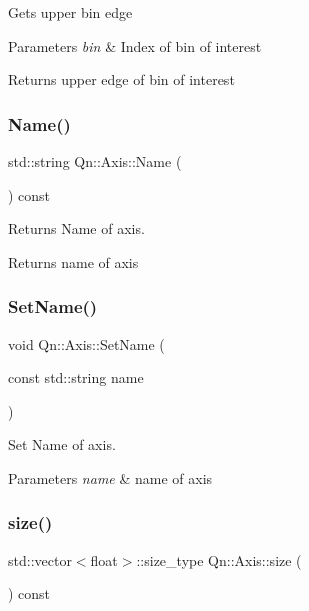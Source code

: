 Gets upper bin edge 
\begin{DoxyParams}{Parameters}
{\em bin} & Index of bin of interest \\
\hline
\end{DoxyParams}
\begin{DoxyReturn}{Returns}
upper edge of bin of interest 
\end{DoxyReturn}
\mbox{\label{classQn_1_1Axis_a355ae8809138b8b1017d51d607059ea6}} 
\subsubsection{\texorpdfstring{Name()}{Name()}}
{\footnotesize\ttfamily std\+::string Qn\+::\+Axis\+::\+Name (\begin{DoxyParamCaption}{ }\end{DoxyParamCaption}) const\hspace{0.3cm}{\ttfamily [inline]}}

Returns Name of axis. \begin{DoxyReturn}{Returns}
name of axis 
\end{DoxyReturn}
\mbox{\label{classQn_1_1Axis_a80eca8411e7749624fbd146248869fc8}} 
\subsubsection{\texorpdfstring{Set\+Name()}{SetName()}}
{\footnotesize\ttfamily void Qn\+::\+Axis\+::\+Set\+Name (\begin{DoxyParamCaption}\item[{const std\+::string}]{name }\end{DoxyParamCaption})\hspace{0.3cm}{\ttfamily [inline]}}

Set Name of axis. 
\begin{DoxyParams}{Parameters}
{\em name} & name of axis \\
\hline
\end{DoxyParams}
\mbox{\label{classQn_1_1Axis_ac3db40c16950698d698f55bcb1c51bf9}} 
\subsubsection{\texorpdfstring{size()}{size()}}
{\footnotesize\ttfamily std\+::vector$<$float$>$\+::size\+\_\+type Qn\+::\+Axis\+::size (\begin{DoxyParamCaption}{ }\end{DoxyParamCaption}) const\hspace{0.3cm}{\ttfamily [inline]}}

